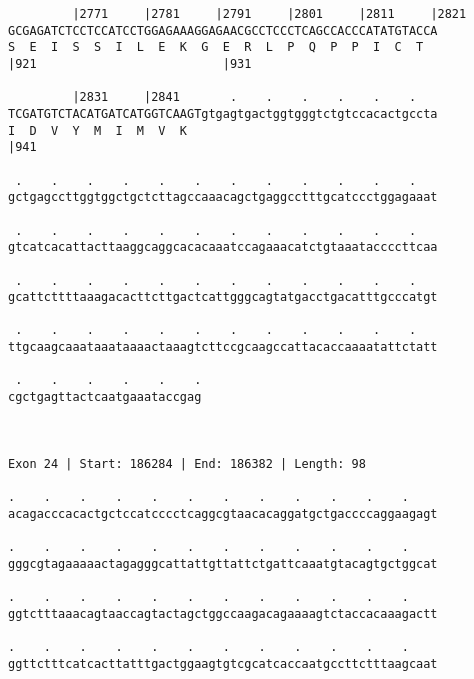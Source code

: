 \documentclass{article}
\begin{document}
\begin{Verbatim}
         |2771     |2781     |2791     |2801     |2811     |2821
GCGAGATCTCCTCCATCCTGGAGAAAGGAGAACGCCTCCCTCAGCCACCCATATGTACCA
S  E  I  S  S  I  L  E  K  G  E  R  L  P  Q  P  P  I  C  T  
|921                          |931                          
  
         |2831     |2841       .    .    .    .    .    .   
TCGATGTCTACATGATCATGGTCAAGTgtgagtgactggtgggtctgtccacactgccta
I  D  V  Y  M  I  M  V  K                                   
|941                                                        
  
 .    .    .    .    .    .    .    .    .    .    .    .   
gctgagccttggtggctgctcttagccaaacagctgaggcctttgcatccctggagaaat
                                                            
 .    .    .    .    .    .    .    .    .    .    .    .   
gtcatcacattacttaaggcaggcacacaaatccagaaacatctgtaaataccccttcaa
                                                            
 .    .    .    .    .    .    .    .    .    .    .    .   
gcattcttttaaagacacttcttgactcattgggcagtatgacctgacatttgcccatgt
                                                            
 .    .    .    .    .    .    .    .    .    .    .    .   
ttgcaagcaaataaataaaactaaagtcttccgcaagccattacaccaaaatattctatt
                                                            
 .    .    .    .    .    .
cgctgagttactcaatgaaataccgag
                           
                           
 
Exon 24 | Start: 186284 | End: 186382 | Length: 98
 
.    .    .    .    .    .    .    .    .    .    .    .    
acagacccacactgctccatcccctcaggcgtaacacaggatgctgaccccaggaagagt
                                                            
.    .    .    .    .    .    .    .    .    .    .    .    
gggcgtagaaaaactagagggcattattgttattctgattcaaatgtacagtgctggcat
                                                            
.    .    .    .    .    .    .    .    .    .    .    .    
ggtctttaaacagtaaccagtactagctggccaagacagaaaagtctaccacaaagactt
                                                            
.    .    .    .    .    .    .    .    .    .    .    .    
ggttctttcatcacttatttgactggaagtgtcgcatcaccaatgccttctttaagcaat
                                                            

\end{Verbatim}
\end{document}
